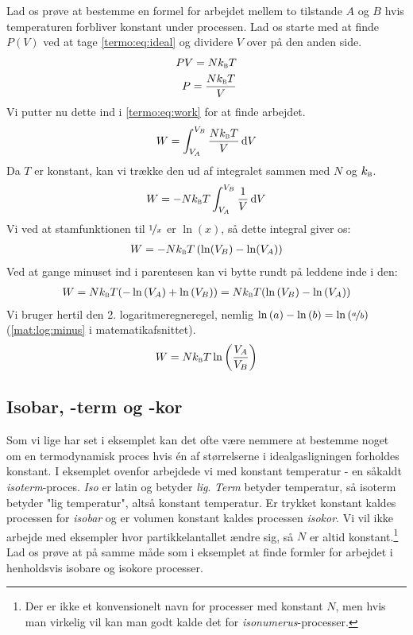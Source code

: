 \documentclass[crop=false, class=memoir]{standalone}
\begin{document}
Lad os prøve at bestemme en formel for arbejdet mellem to tilstande $A$ og $B$ hvis temperaturen forbliver konstant under processen. Lad os starte med at finde $P(V)$ ved at tage \cref{termo:eq:ideal} og dividere $V$ over på den anden side.
\begin{align}
    P V = N k_\textsc{b} T\\
    P = \frac{N k_\textsc{b} T}{V}
\end{align}
Vi putter nu dette ind i \ref{termo:eq:work} for at finde arbejdet.
\begin{align}
    W = \int_{V_A}^{V_B} \frac{N k_\textsc{b} T}{V} \dd{V}
    \label{termo:eq:work_int}
\end{align}
Da $T$ er konstant, kan vi trække den ud af integralet sammen med $N$ og $k_\textsc{b}$.
\begin{align}
    W = - N k_\textsc{b} T \int_{V_A}^{V_B} \frac{1}{V} \dd{V}
\end{align}
Vi ved at stamfunktionen til $\nicefrac{1}{x}$ er $\ln{(x)}$, så dette integral giver os:
\begin{align}
    W = - N k_\textsc{b} T \left(\ln(V_B) - \ln(V_A) \right)
\end{align}
Ved at gange minuset ind i parentesen kan vi bytte rundt på leddene inde i den:
\begin{align}
    W = Nk_\textsc{b} T(-\ln{(V_A)} + \ln{(V_B)}) = Nk_\textsc{b} T (\ln{(V_B)} - \ln{(V_A)})
\end{align}
Vi bruger hertil den 2. logaritmeregneregel, nemlig $\ln{(a)} - \ln{(b)} = \ln{(\nicefrac{a}{b})}$ (\cref{mat:log:minus} i matematikafsnittet).
\begin{align}
    W = N k_\textsc{b} T \ln{\left( \frac{V_A}{V_B} \right)}
    \label{termo:eq:term_work}
\end{align}

\subsection{Isobar, -term og -kor}

Som vi lige har set i eksemplet kan det ofte være nemmere at bestemme noget om en termodynamisk proces hvis én af størrelserne i idealgasligningen forholdes konstant. I eksemplet ovenfor arbejdede vi med konstant temperatur - en såkaldt \emph{isoterm}-proces. \emph{Iso} er latin og betyder \emph{lig}. \emph{Term} betyder temperatur, så isoterm betyder "lig temperatur", altså konstant temperatur. Er trykket konstant kaldes processen for \emph{isobar} og er volumen konstant kaldes processen \emph{isokor}. Vi vil ikke arbejde med eksempler hvor partikkelantallet ændre sig, så $N$ er altid konstant.\footnote{Der er ikke et konvensionelt navn for processer med konstant $N$, men hvis man virkelig vil kan man godt kalde det for \emph{isonumerus}-processer.} Lad os prøve at på samme måde som i eksemplet at finde formler for arbejdet i henholdsvis isobare og isokore processer.
\end{document}
